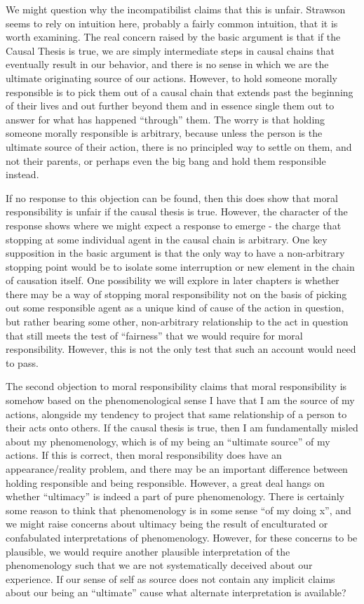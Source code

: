 \documentclass[phd,12pt,oneside,paper=letterpaper]{ubcthesis}
\begin{document}
We might question why the incompatibilist claims that this is unfair. Strawson seems to rely on intuition here, probably a fairly common intuition, that it is worth examining. The real concern raised by the basic argument is that if the Causal Thesis is true, we are simply intermediate steps in causal chains that eventually result in our behavior, and there is no sense in which we are the ultimate originating source of our actions. However, to hold someone morally responsible is to pick them out of a causal chain that extends past the beginning of their lives and out further beyond them and in essence single them out to answer for what has happened ``through'' them. The worry is that holding someone morally responsible is arbitrary, because unless the person is the ultimate source of their action, there is no principled way to settle on them, and not their parents, or perhaps even the big bang and hold them responsible instead.

If no response to this objection can be found, then this does show that moral responsibility is unfair if the causal thesis is true. However, the character of the response shows where we might expect a response to emerge - the charge that stopping at some individual agent in the causal chain is arbitrary. One key supposition in the basic argument is that the only way to have a non-arbitrary stopping point would be to isolate some interruption or new element in the chain of causation itself. One possibility we will explore in later chapters is whether there may be a way of stopping moral responsibility not on the basis of picking out some responsible agent as a unique kind of cause of the action in question, but rather bearing some other, non-arbitrary relationship to the act in question that still meets the test of ``fairness'' that we would require for moral responsibility.  However, this is not the only test that such an account would need to pass. 

The second objection to moral responsibility claims that moral responsibility is somehow based on the phenomenological sense I have that I am the source of my actions, alongside my tendency to project that same relationship of a person to their acts onto others. If the causal thesis is true, then I am fundamentally misled about my phenomenology, which is of my being an ``ultimate source'' of my actions. If this is correct, then moral responsibility does have an appearance/reality problem, and there may be an important difference between holding responsible and being responsible. However, a great deal hangs on whether ``ultimacy'' is indeed a part of pure phenomenology. There is certainly some reason to think that phenomenology is in some sense ``of my doing x'', and we might raise concerns about ultimacy being the result of enculturated or confabulated interpretations of phenomenology. However, for these concerns to be plausible, we would require another plausible interpretation of the phenomenology such that we are not systematically deceived about our experience. If our sense of self as source does not contain any implicit claims about our being an ``ultimate'' cause what alternate interpretation is available? 
\end{document}
